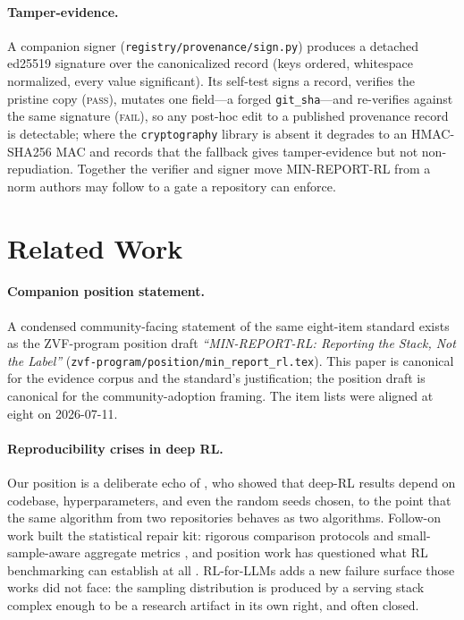 \documentclass{article}  \usepackage[preprint,nonatbib]{neurips_2026} \usepackage[numbers]{natbib}
\begin{document}
\paragraph{Tamper-evidence.} A companion signer
(\texttt{registry/provenance/sign.py}) produces a detached ed25519 signature
over the canonicalized record (keys ordered, whitespace normalized, every value
significant). Its self-test signs a record, verifies the pristine copy
(\textsc{pass}), mutates one field---a forged \texttt{git\_sha}---and re-verifies
against the same signature (\textsc{fail}), so any post-hoc edit to a published
provenance record is detectable; where the \texttt{cryptography} library is
absent it degrades to an HMAC-SHA256 MAC and records that the fallback gives
tamper-evidence but not non-repudiation. Together the verifier and signer move
MIN-REPORT-RL from a norm authors may follow to a gate a repository can enforce.
 \section{Related Work}
\label{sec:p5-related}

\paragraph{Companion position statement.} A condensed community-facing
statement of the same eight-item standard exists as the ZVF-program
position draft \emph{``MIN-REPORT-RL: Reporting the Stack, Not the
Label''} (\texttt{zvf-program/position/min\_report\_rl.tex}). This paper
is canonical for the evidence corpus and the standard's justification;
the position draft is canonical for the community-adoption framing. The
item lists were aligned at eight on 2026-07-11.

\paragraph{Reproducibility crises in deep RL.} Our position is a deliberate
echo of \citet{henderson2018deep}, who showed that deep-RL results depend on
codebase, hyperparameters, and even the random seeds chosen, to the point
that the same algorithm from two repositories behaves as two algorithms.
Follow-on work built the statistical repair kit: rigorous comparison
protocols \citep{colas2019hitchhiker} and small-sample-aware aggregate
metrics \citep{agarwal2021deep}, and position work has questioned what RL
benchmarking can establish at all \citep{jordan2024benchmarking}. RL-for-LLMs
adds a new failure surface those works did not face: the sampling
distribution is produced by a serving stack complex enough to be a research
artifact in its own right, and often closed.
\end{document}
